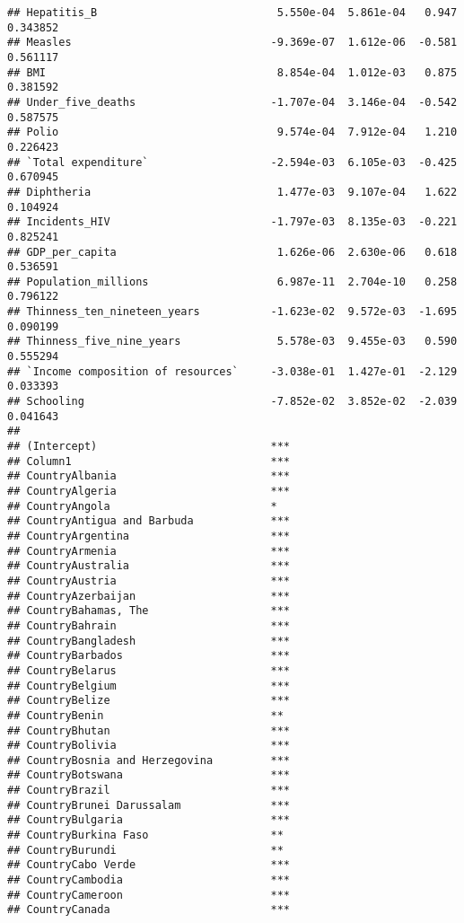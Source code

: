\documentclass[
]{article}
\begin{document}
\begin{verbatim}
## Hepatitis_B                            5.550e-04  5.861e-04   0.947 0.343852
## Measles                               -9.369e-07  1.612e-06  -0.581 0.561117
## BMI                                    8.854e-04  1.012e-03   0.875 0.381592
## Under_five_deaths                     -1.707e-04  3.146e-04  -0.542 0.587575
## Polio                                  9.574e-04  7.912e-04   1.210 0.226423
## `Total expenditure`                   -2.594e-03  6.105e-03  -0.425 0.670945
## Diphtheria                             1.477e-03  9.107e-04   1.622 0.104924
## Incidents_HIV                         -1.797e-03  8.135e-03  -0.221 0.825241
## GDP_per_capita                         1.626e-06  2.630e-06   0.618 0.536591
## Population_millions                    6.987e-11  2.704e-10   0.258 0.796122
## Thinness_ten_nineteen_years           -1.623e-02  9.572e-03  -1.695 0.090199
## Thinness_five_nine_years               5.578e-03  9.455e-03   0.590 0.555294
## `Income composition of resources`     -3.038e-01  1.427e-01  -2.129 0.033393
## Schooling                             -7.852e-02  3.852e-02  -2.039 0.041643
##                                          
## (Intercept)                           ***
## Column1                               ***
## CountryAlbania                        ***
## CountryAlgeria                        ***
## CountryAngola                         *  
## CountryAntigua and Barbuda            ***
## CountryArgentina                      ***
## CountryArmenia                        ***
## CountryAustralia                      ***
## CountryAustria                        ***
## CountryAzerbaijan                     ***
## CountryBahamas, The                   ***
## CountryBahrain                        ***
## CountryBangladesh                     ***
## CountryBarbados                       ***
## CountryBelarus                        ***
## CountryBelgium                        ***
## CountryBelize                         ***
## CountryBenin                          ** 
## CountryBhutan                         ***
## CountryBolivia                        ***
## CountryBosnia and Herzegovina         ***
## CountryBotswana                       ***
## CountryBrazil                         ***
## CountryBrunei Darussalam              ***
## CountryBulgaria                       ***
## CountryBurkina Faso                   ** 
## CountryBurundi                        ** 
## CountryCabo Verde                     ***
## CountryCambodia                       ***
## CountryCameroon                       ***
## CountryCanada                         ***

\end{verbatim}
\end{document}
